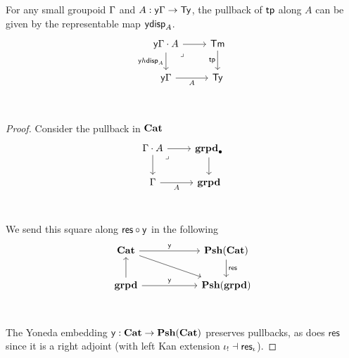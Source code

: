 \begin{cor}
  For any small groupoid $\Gamma$ and $A : \mathsf{y} \Gamma \to \mathsf{Ty}$,
  the pullback of $\mathsf{tp}$ along $A$ can be given by the representable
  map $\mathsf{y} \mathsf{disp}_{A}$.
  \[\begin{tikzcd}
    {\yo \Ga \cdot A} & \Term \\
    {\yo \Ga} & \Type \\
    {}
    \arrow[from=1-1, to=1-2]
    \arrow["{\yo h\disp A}"', from=1-1, to=2-1]
    \arrow["\lrcorner"{anchor=center, pos=0.125}, draw=none, from=1-1, to=2-2]
    \arrow["\tp"', from=1-2, to=2-2]
    \arrow["A"', from=2-1, to=2-2]
  \end{tikzcd}\]
\end{cor}
\begin{proof}
  Consider the pullback in $\mathbf{Cat}$
  \[\begin{tikzcd}
    {\Ga \cdot A} & \ptgrpd \\
    \Ga & \grpd \\
    {}
    \arrow[from=1-1, to=1-2]
    \arrow[from=1-1, to=2-1]
    \arrow["\lrcorner"{anchor=center, pos=0.125}, draw=none, from=1-1, to=2-2]
    \arrow[from=1-2, to=2-2]
    \arrow["A"', from=2-1, to=2-2]
  \end{tikzcd}\]
  We send this square along $\textsf{res} \circ \mathsf{y}$ in the following
  \[\begin{tikzcd}
    \Cat && \PshCat \\
    \grpd && \Pshgrpd \\
    & {}
    \arrow["\yo", from=1-1, to=1-3]
    \arrow[from=1-1, to=2-3]
    \arrow["{\textsf{res}}", from=1-3, to=2-3]
    \arrow[from=2-1, to=1-1]
    \arrow["\yo", from=2-1, to=2-3]
  \end{tikzcd}\]
  The Yoneda embedding $\mathsf{y} : \mathbf{Cat} \to \mathbf{Psh}(\mathbf{Cat})$ preserves pullbacks,
  as does $\textsf{res}$ since it is a right adjoint
  (with left Kan extension $\iota_{!} \dashv \textsf{res}_{\iota}$).
\end{proof}

